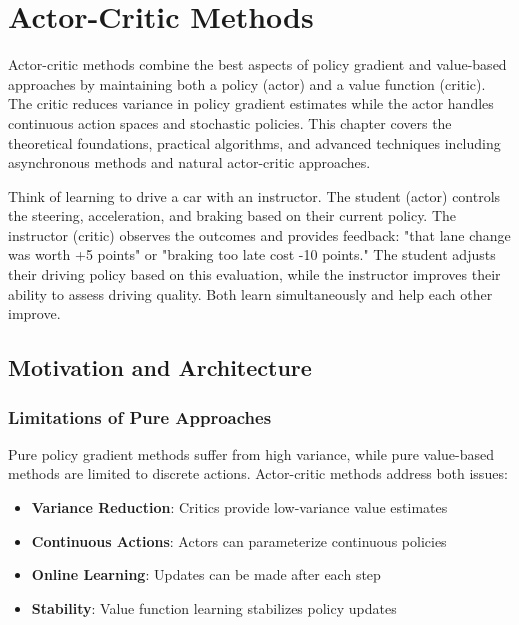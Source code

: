 \chapter{Actor-Critic Methods}
\label{ch:actor-critic}

\begin{keyideabox}
Actor-critic methods combine the best aspects of policy gradient and value-based approaches by maintaining both a policy (actor) and a value function (critic). The critic reduces variance in policy gradient estimates while the actor handles continuous action spaces and stochastic policies. This chapter covers the theoretical foundations, practical algorithms, and advanced techniques including asynchronous methods and natural actor-critic approaches.
\end{keyideabox}

\begin{intuitionbox}
Think of learning to drive a car with an instructor. The student (actor) controls the steering, acceleration, and braking based on their current policy. The instructor (critic) observes the outcomes and provides feedback: "that lane change was worth +5 points" or "braking too late cost -10 points." The student adjusts their driving policy based on this evaluation, while the instructor improves their ability to assess driving quality. Both learn simultaneously and help each other improve.
\end{intuitionbox}

\section{Motivation and Architecture}

\subsection{Limitations of Pure Approaches}

Pure policy gradient methods suffer from high variance, while pure value-based methods are limited to discrete actions. Actor-critic methods address both issues:

\begin{itemize}
    \item \textbf{Variance Reduction}: Critics provide low-variance value estimates
    \item \textbf{Continuous Actions}: Actors can parameterize continuous policies  
    \item \textbf{Online Learning}: Updates can be made after each step
    \item \textbf{Stability}: Value function learning stabilizes policy updates
\end{itemize}

